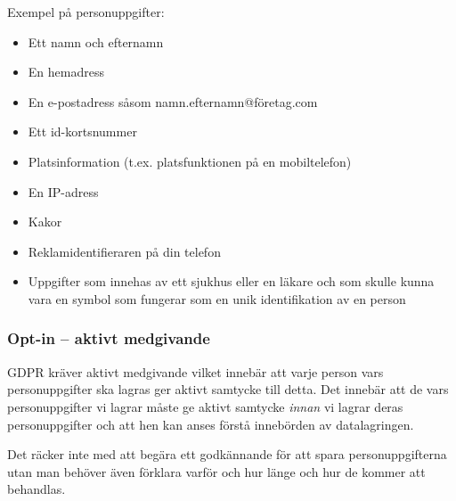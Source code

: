 \documentclass[a4paper]{dtek}
\begin{document}
Exempel på personuppgifter:
\begin{itemize}
    \item Ett namn och efternamn
    \item En hemadress
    \item En e-postadress såsom namn.efternamn@företag.com
    \item Ett id-kortsnummer
    \item Platsinformation (t.ex. platsfunktionen på en mobiltelefon)
    \item En IP-adress
    \item Kakor
    \item Reklamidentifieraren på din telefon
    \item Uppgifter som innehas av ett sjukhus eller en läkare och som skulle kunna vara en symbol som fungerar som en unik identifikation av en person
\end{itemize}

\subsubsection{Opt-in – aktivt medgivande}
GDPR kräver aktivt medgivande vilket innebär att varje person vars personuppgifter ska
lagras ger aktivt samtycke till detta. Det innebär att de vars personuppgifter vi lagrar
måste ge aktivt samtycke \textit{innan} vi lagrar deras personuppgifter och att hen kan anses
förstå innebörden av datalagringen.

Det räcker inte med att begära ett godkännande för att spara personuppgifterna utan man behöver även förklara varför och hur länge och hur de kommer att behandlas.
\end{document}
